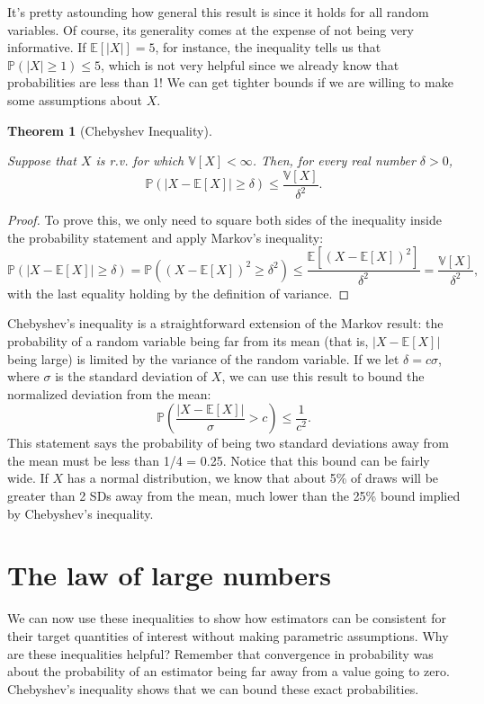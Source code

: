 \documentclass[
  13pt,
  letterpaper,
  DIV=11,
  numbers=noendperiod]{scrreprt}
\newcommand{\E}{\mathbb{E}}
\newcommand{\V}{\mathbb{V}}
\renewcommand{\P}{\mathbb{P}}
\theoremstyle{definition}
\theoremstyle{definition}
\theoremstyle{plain}
\newtheorem{theorem}{Theorem}[chapter]
\theoremstyle{remark}
\begin{document}
It's pretty astounding how general this result is since it holds for all
random variables. Of course, its generality comes at the expense of not
being very informative. If \(\E[|X|] = 5\), for instance, the inequality
tells us that \(\P(|X| \geq 1) \leq 5\), which is not very helpful since
we already know that probabilities are less than 1! We can get tighter
bounds if we are willing to make some assumptions about \(X\).

\begin{theorem}[Chebyshev
Inequality]\protect\hypertarget{thm-chebyshev}{}\label{thm-chebyshev}

Suppose that \(X\) is r.v. for which \(\V[X] < \infty\). Then, for every
real number \(\delta > 0\), \[
\P(|X-\E[X]| \geq \delta) \leq \frac{\V[X]}{\delta^2}.
\]

\end{theorem}

\begin{proof}
To prove this, we only need to square both sides of the inequality
inside the probability statement and apply Markov's inequality: \[
\P\left( |X - \E[X]| \geq \delta \right) = \P((X-\E[X])^2 \geq \delta^2) \leq \frac{\E[(X - \E[X])^2]}{\delta^2} = \frac{\V[X]}{\delta^2},
\] with the last equality holding by the definition of variance.
\end{proof}

Chebyshev's inequality is a straightforward extension of the Markov
result: the probability of a random variable being far from its mean
(that is, \(|X-\E[X]|\) being large) is limited by the variance of the
random variable. If we let \(\delta = c\sigma\), where \(\sigma\) is the
standard deviation of \(X\), we can use this result to bound the
normalized deviation from the mean: \[
\P\left(\frac{|X - \E[X]|}{\sigma} > c \right) \leq \frac{1}{c^2}.
\] This statement says the probability of being two standard deviations
away from the mean must be less than 1/4 = 0.25. Notice that this bound
can be fairly wide. If \(X\) has a normal distribution, we know that
about 5\% of draws will be greater than 2 SDs away from the mean, much
lower than the 25\% bound implied by Chebyshev's inequality.

\section{The law of large numbers}\label{the-law-of-large-numbers}

We can now use these inequalities to show how estimators can be
consistent for their target quantities of interest without making
parametric assumptions. Why are these inequalities helpful? Remember
that convergence in probability was about the probability of an
estimator being far away from a value going to zero. Chebyshev's
inequality shows that we can bound these exact probabilities.
\end{document}
